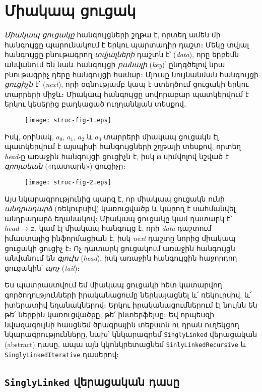 
%
%
\section{Միակապ ցուցակ}
\label{sec:singly}

\emph{Միակապ ցուցակը} հանգույցների շղթա է, որտեղ ամեն մի 
հանգույցը պարունակում է երկու պարտադիր դաշտ։ Մեկը տվյալ 
հանգույցը բնութագրող \emph{տվյալների} դաշտն է՝ (\emph{data}), 
որը երբեմն անվանում են նաև հանգույցի \emph{բանալի} 
(\emph{key})՝ ընդգծելով նրա բնութագրիչ դերը հանգույցի համար։ 
Մյուսը նույնանման հանգույցի \emph{ցուցիչն} է՝ (\emph{next}), 
որի օգնությամբ կապ է ստեղծում ցուցակի երկու տարրերի միջև։ 
Միակապ հանգույցը սովորաբար պատկերվում է երկու կեսերից 
բաղկացած ուղղանկյան տեսքով․

\begin{figure}[h]
\centering
\texttt{[image: struc-fig-1.eps]}
\end{figure}

Իսկ, օրինակ, \(a_0\), \(a_1\), \(a_2\) և \(a_3\) տարրերի
միակապ ցուցակն էլ պատկերվում է այսպիսի հանգույցների շղթայի 
տեսքով, որտեղ \emph{head}֊ը առաջին հանգույցի ցուցիչն է, իսկ 
\(\boxslash\) սիմվոլով նշված է \emph{զրոյական} («դատարկ») 
ցուցիչը։

\begin{figure}[h]
\centering
\texttt{[image: struc-fig-2.eps]}
\end{figure}

Այս նկարագրությունից պարզ է, որ միակապ ցուցակն ունի \emph{անդրադարձ} 
(ռեկուրսիվ) կառուցվածք և կարող է սահմանվել անդրադարձ եղանակով։ 
Միակապ ցուցակը կամ դատարկ է՝ \(head\rightarrow\boxslash\), կամ էլ 
միակապ հանգույց է, որի \emph{data} դաշտում իմաստալից ինֆորմացիան է, 
իսկ \emph{next} դաշտը նորից միակապ ցուցակի ցուցիչ է։ Ոչ դատարկ 
ցուցակում առաջին հանգույցն անվանում են \emph{գլուխ} (\emph{head}), 
իսկ առաջին հանգույցին հաջորդող ցուցակին՝ \emph{պոչ} (\emph{tail})։

\medskip
Ես պատրաստվում եմ միակապ ցուցակի հետ կատարվող գործողությունների 
իրականացումը ներկայացնել և՛ ռեկուրսիվ, և՛ իտերատիվ եղանակներով։
Երկու իրականացումներում էլ նույնն են թե՛ ներքին կառուցվածքը, թե՛
ինտերֆեյսը։ Եվ որպեսզի նվազագույնի հասցնեմ ծրագրային տեքստն ու 
դրան ուղեկցող նկարագրությունները, նախ՝ կնկարագրեմ 
\texttt{SinglyLinked} վերացական (abstract) դասը, ապա այն 
կկոնկրետացնեմ \texttt{SinlyLinkedRecursive} և
\texttt{SinglyLinkedIterative} դասերով։


%
%
\subsection{\texttt{SinglyLinked} վերացական դասը}

